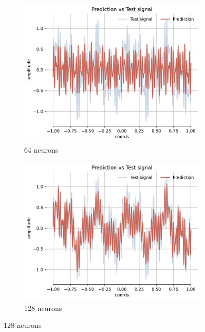 \begin{figure}[h!]
    \centering
    \begin{subfigure}[b]{0.32\textwidth}
        \centering
        \includegraphics[width=\textwidth]{img/ch4/prediction_w45all_hf64.pdf}
        \caption{64 neurons}
        \label{fig:rec-64-full-45}
    \end{subfigure}
    \hfill
    \begin{subfigure}[b]{0.32\textwidth}
        \centering
        \includegraphics[width=\textwidth]{img/ch4/prediction_w45all_hf128.pdf}
        \caption{128 neurons}
        \label{fig:rec-128-full-45}
    \end{subfigure}

\end{figure}

